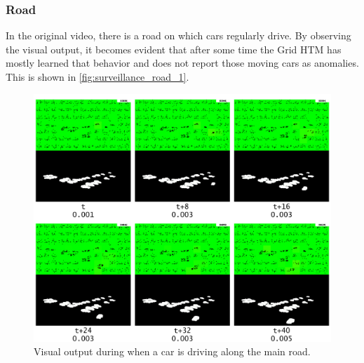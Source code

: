 \subsubsection{Road}
In the original video, there is a road on which cars regularly drive. By observing the visual output, it becomes evident that after some time the Grid HTM has mostly learned that behavior and does not report those moving cars as anomalies. This is shown in \autoref{fig:surveillance_road_1}.
\begin{figure}[H]
    \centering
    \includegraphics[width=\textwidth]{resources/experiments/surveillance/surveillance_road_1.png}
    \caption[Car Driving Along Main Road]{Visual output during when a car is driving along the main road.}
    \label{fig:surveillance_road_1}
\end{figure}
